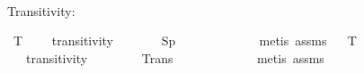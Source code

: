 \begin{isabellebody}
{}\isanewline
%
\isadelimproof
\ \ %
\endisadelimproof
%
\isatagproof
{}\isamarkupfalse%
%
\endisatagproof
{\isafoldproof}%
%
\isadelimproof
%
\endisadelimproof
%
\begin{isamarkuptext}%
Transitivity:%
\end{isamarkuptext}\isamarkuptrue%
\isamarkupfalse%
\ T{}{}{\isacharcolon}{\kern0pt}\ \isanewline
\ \ \ transitivity\ \ \ \isanewline
\ \ \ \ Sp{\isacharprime}{\kern0pt}{\isacharcolon}{\kern0pt}\ {\isachardoublequoteopen}{\isasymlfloor}{\isacharparenleft}{\kern0pt}\ {\isasymP}{\isacharless}{\kern0pt}{\isasympsi}{\isacharbar}{\kern0pt}{\isasymphi}{\isachargreater}{\kern0pt}\ \isactrlbold {\isasymand}\ {\isasymodot}{\isacharless}{\kern0pt}{\isacharparenleft}{\kern0pt}{\isasympsi}\isactrlbold {\isasymrightarrow}{\isasymchi}{\isacharparenright}{\kern0pt}{\isacharbar}{\kern0pt}{\isasymphi}{\isachargreater}{\kern0pt}{\isacharparenright}{\kern0pt}\ \isactrlbold {\isasymrightarrow}\ {\isasymodot}{\isacharless}{\kern0pt}{\isasymchi}{\isacharbar}{\kern0pt}{\isacharparenleft}{\kern0pt}{\isasymphi}\isactrlbold {\isasymand}{\isasympsi}{\isacharparenright}{\kern0pt}{\isachargreater}{\kern0pt}{\isasymrfloor}{\isachardoublequoteclose}\ \ \ \isanewline
%
\isadelimproof
\ \ %
\endisadelimproof
%
\isatagproof
{}\isamarkupfalse%
\ {\isacharparenleft}{\kern0pt}metis\ assms{\isacharparenright}{\kern0pt}%
\endisatagproof
{\isafoldproof}%
%
\isadelimproof
\ \isanewline
%
\endisadelimproof
\isanewline
{}\isamarkupfalse%
\ T{}{}{\isacharcolon}{\kern0pt}\ \isanewline
\ \ \ transitivity\ \ \ \ \isanewline
\ \ \ \ Trans{\isacharprime}{\kern0pt}{\isacharcolon}{\kern0pt}\ {\isachardoublequoteopen}{\isasymlfloor}{\isacharparenleft}{\kern0pt}\ {\isasymP}{\isacharless}{\kern0pt}{\isasymphi}{\isacharbar}{\kern0pt}{\isasymphi}\isactrlbold {\isasymor}{\isasympsi}{\isachargreater}{\kern0pt}\ \isactrlbold {\isasymand}\ {\isasymP}{\isacharless}{\kern0pt}{\isasympsi}{\isacharbar}{\kern0pt}{\isasympsi}\isactrlbold {\isasymor}{\isasymxi}{\isachargreater}{\kern0pt}\ {\isacharparenright}{\kern0pt}\isactrlbold {\isasymrightarrow}\ {\isasymP}{\isacharless}{\kern0pt}{\isasymphi}{\isacharbar}{\kern0pt}{\isasymphi}\isactrlbold {\isasymor}{\isasymxi}{\isachargreater}{\kern0pt}{\isasymrfloor}{\isachardoublequoteclose}\ \ \ \isanewline
%
\isadelimproof
\ \ %
\endisadelimproof
%
\isatagproof
{}\isamarkupfalse%
\ {\isacharparenleft}{\kern0pt}metis\ assms{\isacharparenright}{\kern0pt}%

\end{isabellebody}
